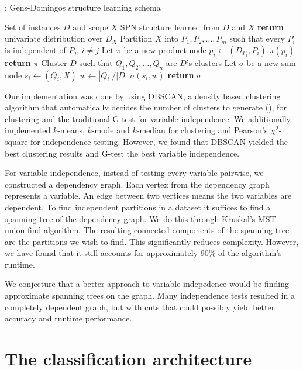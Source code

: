 \begin{algorithm}[H]
  \caption*{: Gens-Domingos structure learning schema}
  \begin{algorithmic}[1]
    \Require Set of instances $D$ and scope $X$
    \Ensure SPN structure learned from $D$ and $X$
      \State \textbf{return} univariate distribution over $D_X$
    \Else%
      \State Partition $X$ into $P_1,P_2,\ldots,P_m$ such that every $P_i$ is independent of $P_j$,
        $i\neq j$
        \State Let $\pi$ be a new product node
          \State $p_i\gets$$(D_{P_i}, P_i)$
          \State $\pi$$(p_i)$
        \EndFor%
        \State \textbf{return} $\pi$
      \Else%
        \State Cluster $D$ such that $Q_1,Q_2,\ldots,Q_n$ are $D$'s clusters
        \State Let $\sigma$ be a new sum node
          \State $s_i\gets$$(Q_i, X)$
          \State $w\gets |Q_i|/|D|$
          \State $\sigma$$(s_i, w)$ 
        \EndFor%
        \State \textbf{return} $\sigma$
      \EndIf%
    \EndIf%
  \end{algorithmic}
\end{algorithm}

Our implementation was done by using DBSCAN, a density based clustering algorithm that
automatically decides the number of clusters to generate (\cite{dbscan}), for clustering and the
traditional G-test for variable independence. We additionally implemented $k$-means, $k$-mode and
$k$-median for clustering and Pearson's $\chi^2$-square for independence testing. However, we found
that DBSCAN yielded the best clustering results and G-test the best variable independence.

For variable independence, instead of testing every variable pairwise, we constructed a dependency
graph. Each vertex from the dependency graph represents a variable. An edge between two vertices
means the two variables are dependent. To find independent partitions in a dataset it suffices to
find a spanning tree of the dependency graph. We do this through Kruskal's MST union-find
algorithm. The resulting connected components of the spanning tree are the partitions we wish to
find. This significantly reduces complexity. However, we have found that it still accounts for
approximately 90\% of the algorithm's runtime.

We conjecture that a better approach to variable indepedence would be finding approximate spanning
trees on the graph. Many independence tests resulted in a completely dependent graph, but with
cuts that could possibly yield better accuracy and runtime performance.

\section{The classification architecture}


